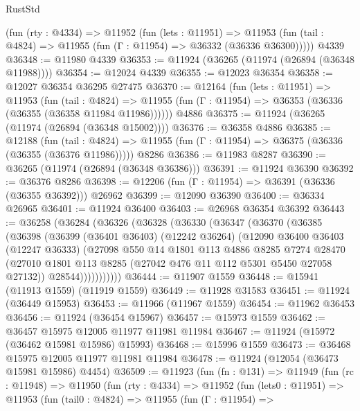 \begin{lexlean}{RustStd}
\begin{coremodule}
    (fun (rty : @4334) =>
    @11952
      (fun (lets : @11951) =>
      @11953 (fun (tail : @4824) => @11955 (fun (Γ : @11954) => @36332 (@36336 @36300)))))
    @4339
@36348 := @11980 @4339
@36353 := @11924 (@36265 (@11974 (@26894 (@36348 @11988))))
@36354 := @12024 @4339
@36355 := @12023 @36354
@36358 := @12027 @36354 @36295 @27475
@36370 := @12164
    (fun (lets : @11951) =>
    @11953
      (fun (tail : @4824) =>
      @11955 (fun (Γ : @11954) => @36353 (@36336 (@36355 (@36358 @11984 @11986))))))
    @4886
@36375 := @11924 (@36265 (@11974 (@26894 (@36348 @15002))))
@36376 := @36358 @4886
@36385 := @12188
    (fun (tail : @4824) => @11955 (fun (Γ : @11954) => @36375 (@36336 (@36355 (@36376 @11986)))))
    @8286
@36386 := @11983 @8287
@36390 := @36265 (@11974 (@26894 (@36348 @36386)))
@36391 := @11924 @36390
@36392 := @36376 @8286
@36398 := @12206 (fun (Γ : @11954) => @36391 (@36336 (@36355 @36392))) @26962
@36399 := @12090 @36390
@36400 := @36334 @26965
@36401 := @11924 @36400
@36403 := @26968 @36354 @36392
@36443 := @36258
    (@36284
      (@36326
        (@36328
          (@36330
            (@36347
              (@36370
                (@36385
                  (@36398
                    (@36399
                      (@36401 @36403)
                      (@12242 @36264)
                      (@12090
                        @36400
                        @36403
                        (@12247 @36333)
                        (@27098
                          @550
                          @14
                          @1801
                          @113
                          @4886
                          @8285
                          @7274
                          @28470
                          (@27010 @1801 @113 @8285 (@27042 @476 @11 @112 @5301 @5450 @27058 @27132))
                          @28544)))))))))))
@36444 := @11907 @1559
@36448 := @15941 (@11913 @1559) (@11919 @1559)
@36449 := @11928 @31583
@36451 := @11924 (@36449 @15953)
@36453 := @11966 (@11967 @1559)
@36454 := @11962 @36453
@36456 := @11924 (@36454 @15967)
@36457 := @15973 @1559
@36462 := @36457 @15975 @12005 @11977 @11981 @11984
@36467 := @11924 (@15972 (@36462 @15981 @15986) @15993)
@36468 := @15996 @1559
@36473 := @36468 @15975 @12005 @11977 @11981 @11984
@36478 := @11924 (@12054 (@36473 @15981 @15986) @4454)
@36509 := @11923
    (fun (fn : @131) =>
    @11949
      (fun (rc : @11948) =>
      @11950
        (fun (rty : @4334) =>
        @11952
          (fun (lets0 : @11951) =>
          @11953
            (fun (tail0 : @4824) =>
            @11955
              (fun (Γ : @11954) =>

\end{coremodule}
\end{lexlean}
